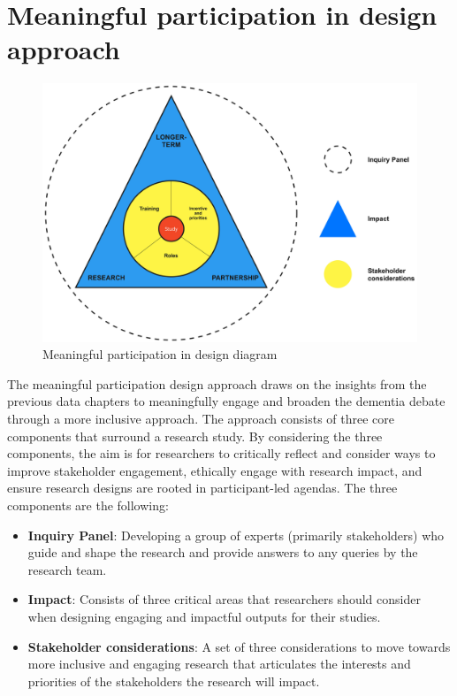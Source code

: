 \section{Meaningful participation in design approach}
\label{Discussion:Design}

\begin{figure}[htp]
\centering
\includegraphics[width=0.8\linewidth]{Images/Discussion/DesignApproach.jpg}
\caption{Meaningful participation in design diagram}
\label{fig:MeaningfulParticipation}
\end{figure}
The meaningful participation design approach draws on the insights from the previous data chapters to meaningfully engage and broaden the dementia debate through a more inclusive approach. The approach consists of three core components that surround a research study. By considering the three components, the aim is for researchers to critically reflect and consider ways to improve stakeholder engagement, ethically engage with research impact, and ensure research designs are rooted in participant-led agendas. The three components are the following:

\begin{itemize}
    \item \textbf{Inquiry Panel}: Developing a group of experts (primarily stakeholders) who guide and shape the research and provide answers to any queries by the research team.
    \item \textbf{Impact}: Consists of three critical areas that researchers should consider when designing engaging and impactful outputs for their studies.
    \item \textbf{Stakeholder considerations}: A set of three considerations to move towards more inclusive and engaging research that articulates the interests and priorities of the stakeholders the research will impact.
\end{itemize}

